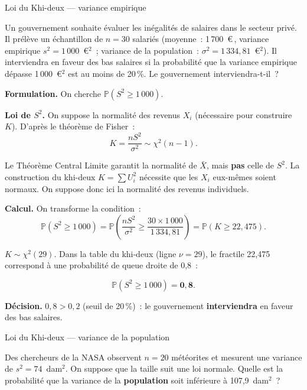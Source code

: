 \documentclass[11pt,a4paper]{article}
\newcommand{\Prob}{\mathbb{P}}
\renewcommand{\P}{\Prob}
\newcommand{\corrsep}{\vspace{4pt}{\color{rulecol}\hrule height 0.6pt}\vspace{6pt}}
\begin{document}
\begin{exercice}{Loi du Khi-deux --- variance empirique}

Un gouvernement souhaite \'evaluer les in\'egalit\'es de salaires dans le secteur priv\'e. Il pr\'el\`eve un \'echantillon de $n=30$ salari\'es (moyenne~: 1\,700~\euro\,, variance empirique $s^2=1\,000$~\euro$^2$~;
variance de la population~: $\sigma^2=1\,334{,}81$~\euro$^2$). Il interviendra en faveur des bas salaires si la probabilit\'e que la variance empirique d\'epasse 1\,000~\euro$^2$ est au moins de 20\,\%.
Le gouvernement interviendra-t-il~?
\end{exercice}

\corrsep

\textbf{Formulation.} On cherche $\P(S^2 \geq 1\,000)$.

\textbf{Loi de $S^2$.} On suppose la normalit\'e des revenus $X_i$ (n\'ecessaire pour construire~$K$). D'apr\`es le th\'eor\`eme de Fisher~:
$$K = \frac{nS^2}{\sigma^2} \sim \chi^2(n-1).$$

\begin{alertbox}
Le Th\'eor\`eme Central Limite garantit la normalit\'e de $\bar{X}$, mais \textbf{pas} celle de $S^2$. La construction du khi-deux $K = \sum U_i^2$ n\'ecessite que les $X_i$ eux-m\^emes soient normaux. On suppose donc ici la normalit\'e des revenus individuels.
\end{alertbox}

\textbf{Calcul.} On transforme la condition~:
$$\P(S^2\geq1\,000) = \P\!\left(\frac{nS^2}{\sigma^2}\geq\frac{30\times1\,000}{1\,334{,}81}\right)
  = \P(K\geq22{,}475).$$

$K\sim\chi^2(29)$. Dans la table du khi-deux (ligne $\nu=29$), le fractile 22,475 correspond \`a une probabilit\'e de queue droite de 0,8~:

$$\P(S^2\geq1\,000) = \mathbf{0{,}8}.$$

\textbf{D\'ecision.} $0{,}8 > 0{,}2$ (seuil de 20\,\%)~: le gouvernement \textbf{interviendra} en faveur des bas salaires.

\begin{exercice}{Loi du Khi-deux --- variance de la population}

Des chercheurs de la NASA observent $n=20$ m\'et\'eorites et mesurent une variance de $s^2=74$~dam$^2$. On suppose que la taille suit une loi normale. Quelle est la probabilit\'e que la variance de la \textbf{population} soit inf\'erieure \`a 107,9~dam$^2$~?
\end{exercice}
\end{document}
